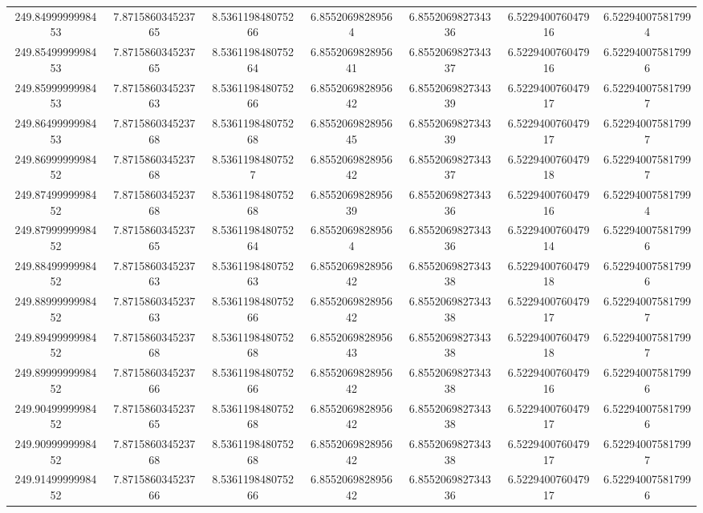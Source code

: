 \begin{center}
{\begin{tabular}{| c | c | c | c | c | c | c |}
249.8499999998453  & 7.871586034523765  & 8.536119848075266  & 6.85520698289564  & 6.855206982734336  & 6.522940076047916  & 6.522940075817994 \\
249.8549999998453  & 7.871586034523765  & 8.536119848075264  & 6.855206982895641  & 6.855206982734337  & 6.522940076047916  & 6.522940075817996 \\
249.8599999998453  & 7.871586034523763  & 8.536119848075266  & 6.855206982895642  & 6.855206982734339  & 6.522940076047917  & 6.522940075817997 \\
249.8649999998453  & 7.871586034523768  & 8.536119848075268  & 6.855206982895645  & 6.855206982734339  & 6.522940076047917  & 6.522940075817997 \\
249.8699999998452  & 7.871586034523768  & 8.53611984807527  & 6.855206982895642  & 6.855206982734337  & 6.522940076047918  & 6.522940075817997 \\
249.8749999998452  & 7.871586034523768  & 8.536119848075268  & 6.855206982895639  & 6.855206982734336  & 6.522940076047916  & 6.522940075817994 \\
249.8799999998452  & 7.871586034523765  & 8.536119848075264  & 6.85520698289564  & 6.855206982734336  & 6.522940076047914  & 6.522940075817996 \\
249.8849999998452  & 7.871586034523763  & 8.536119848075263  & 6.855206982895642  & 6.855206982734338  & 6.522940076047918  & 6.522940075817996 \\
249.8899999998452  & 7.871586034523763  & 8.536119848075266  & 6.855206982895642  & 6.855206982734338  & 6.522940076047917  & 6.522940075817997 \\
249.8949999998452  & 7.871586034523768  & 8.536119848075268  & 6.855206982895643  & 6.855206982734338  & 6.522940076047918  & 6.522940075817997 \\
249.8999999998452  & 7.871586034523766  & 8.536119848075266  & 6.855206982895642  & 6.855206982734338  & 6.522940076047916  & 6.522940075817996 \\
249.9049999998452  & 7.871586034523765  & 8.536119848075268  & 6.855206982895642  & 6.855206982734338  & 6.522940076047917  & 6.522940075817996 \\
249.9099999998452  & 7.871586034523768  & 8.536119848075268  & 6.855206982895642  & 6.855206982734338  & 6.522940076047917  & 6.522940075817997 \\
249.9149999998452  & 7.871586034523766  & 8.536119848075266  & 6.855206982895642  & 6.855206982734336  & 6.522940076047917  & 6.522940075817996 \\

\end{tabular}}
\end{center}
